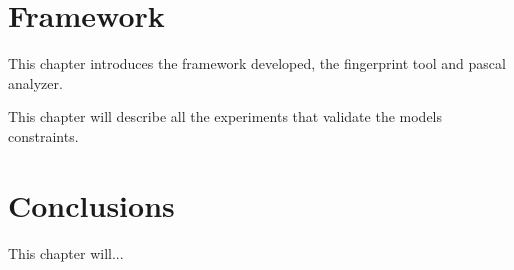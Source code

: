 \documentclass[
papersize=a4,
pagelayout=default,
fontname=latinmodern,
fontsize=11pt,
twoside,
final,
faculty=fpms,
]{umons-Thesis}
\begin{document}
	
	\chapter{Framework}
	This chapter introduces the framework developed, the fingerprint tool and pascal analyzer.
	
	
	

	This chapter will describe all the experiments that validate the models constraints.
	
	
	
	\chapter{Conclusions}
	This chapter will...
	
	
	
	
	\backmatter
	
\end{document}
